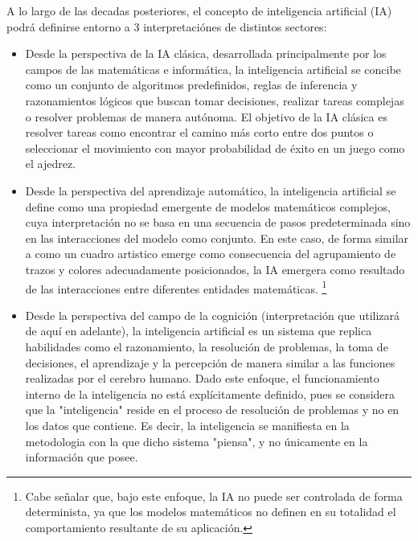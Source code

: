 A lo largo de las decadas posteriores, el concepto de inteligencia artificial (IA) podrá
definirse entorno a 3 interpretaciónes de distintos sectores:

\begin{itemize}
	\item Desde la perspectiva de la IA clásica, desarrollada principalmente por
	      los campos de las matemáticas e informática, la inteligencia artificial se
	      concibe como un conjunto de algoritmos predefinidos, reglas de inferencia y
	      razonamientos lógicos que buscan tomar decisiones, realizar tareas complejas
	      o resolver problemas de manera autónoma. El objetivo de la IA clásica es
	      resolver tareas como encontrar el camino más corto entre dos puntos o
	      seleccionar el movimiento con mayor probabilidad de éxito en un juego como
	      el ajedrez.

	\item Desde la perspectiva del aprendizaje automático, la inteligencia
	      artificial se define como una propiedad emergente de modelos matemáticos
	      complejos, cuya interpretación no se basa en una secuencia de pasos
	      predeterminada sino en las interacciones del modelo como conjunto. En este
	      caso, de forma similar a como un cuadro artistico emerge como consecuencia
	      del agrupamiento de trazos y colores adecuadamente posicionados, la IA
	      emergera como resultado de las interacciones entre diferentes entidades
	      matemáticas.  \footnote{Cabe señalar que, bajo este enfoque, la IA no puede
		      ser controlada de forma determinista, ya que los modelos matemáticos no
		      definen en su totalidad el comportamiento resultante de su aplicación.}

	\item Desde la perspectiva del campo de la cognición (interpretación que
	      utilizará de aquí en adelante), la inteligencia artificial
	      es un sistema que replica habilidades como el razonamiento, la resolución de
	      problemas, la toma de decisiones, el aprendizaje y la percepción de manera
	      similar a las funciones realizadas por el cerebro humano. Dado este enfoque,
	      el funcionamiento interno de la inteligencia no está explícitamente
	      definido, pues se considera que la "inteligencia" reside en el proceso de
	      resolución de problemas y no en los datos que contiene. Es decir, la
	      inteligencia se manifiesta en la metodologia con la que dicho sistema
	      "piensa", y no únicamente en la información que posee.


\end{itemize}
